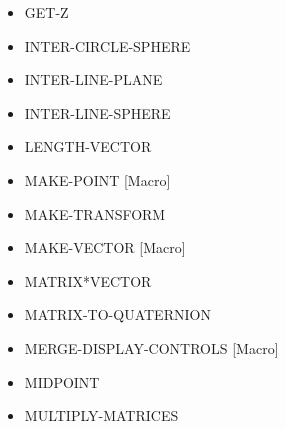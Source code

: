 \documentclass [11pt]{book}
\begin{document}
\begin{itemize}
\item {}GET-Z





\item {}INTER-CIRCLE-SPHERE





\item {}INTER-LINE-PLANE





\item {}INTER-LINE-SPHERE





\item {}LENGTH-VECTOR





\item {}MAKE-POINT [Macro]





\item {}MAKE-TRANSFORM





\item {}MAKE-VECTOR [Macro]





\item {}MATRIX*VECTOR





\item {}MATRIX-TO-QUATERNION





\item {}MERGE-DISPLAY-CONTROLS [Macro]





\item {}MIDPOINT





\item {}MULTIPLY-MATRICES






\end{itemize}
\end{document}
